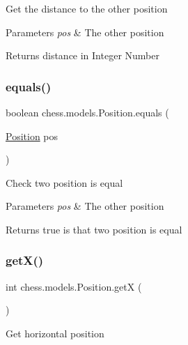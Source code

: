 Get the distance to the other position


\begin{DoxyParams}{Parameters}
{\em pos} & The other position \\
\hline
\end{DoxyParams}
\begin{DoxyReturn}{Returns}
distance in Integer Number 
\end{DoxyReturn}
\mbox{\label{classchess_1_1models_1_1_position_ab66e53b6cb98e557aa0fc811e7987486}} 
\subsubsection{\texorpdfstring{equals()}{equals()}}
{\footnotesize\ttfamily boolean chess.\+models.\+Position.\+equals (\begin{DoxyParamCaption}\item[{\mbox{\hyperlink{classchess_1_1models_1_1_position}{Position}}}]{pos }\end{DoxyParamCaption})}

Check two position is equal


\begin{DoxyParams}{Parameters}
{\em pos} & The other position \\
\hline
\end{DoxyParams}
\begin{DoxyReturn}{Returns}
true is that two position is equal 
\end{DoxyReturn}
\mbox{\label{classchess_1_1models_1_1_position_a1de14ed4ac5e2376caf3ecbf4f415e38}} 
\subsubsection{\texorpdfstring{get\+X()}{getX()}}
{\footnotesize\ttfamily int chess.\+models.\+Position.\+getX (\begin{DoxyParamCaption}{ }\end{DoxyParamCaption})}

Get horizontal position

